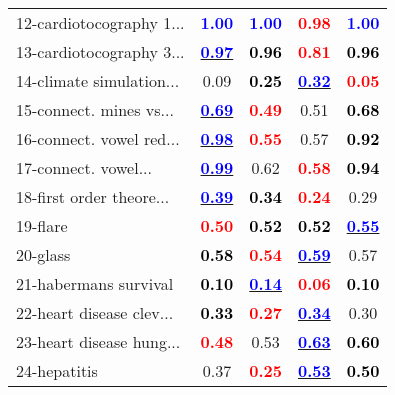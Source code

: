 \begin{table}
\begin{center}
\begin{tabular}{lc|c|c|c}
12-cardiotocography 1... & \textcolor{blue}{\textbf{  1.00}} & \textcolor{blue}{\textbf{  1.00}} & \textcolor{red}{\textbf{  0.98}} & \textcolor{blue}{\textbf{  1.00}} \\
13-cardiotocography 3... & \underline{\textcolor{blue}{\textbf{  0.97}}} & \textcolor{black}{\textbf{  0.96}} & \textcolor{red}{\textbf{  0.81}} & \textcolor{black}{\textbf{  0.96}} \\
14-climate simulation... &   0.09 & \textcolor{black}{\textbf{  0.25}} & \underline{\textcolor{blue}{\textbf{  0.32}}} & \textcolor{red}{\textbf{  0.05}} \\
15-connect. mines vs... & \underline{\textcolor{blue}{\textbf{  0.69}}} & \textcolor{red}{\textbf{  0.49}} &   0.51 & \textcolor{black}{\textbf{  0.68}} \\ \hline
16-connect. vowel red... & \underline{\textcolor{blue}{\textbf{  0.98}}} & \textcolor{red}{\textbf{  0.55}} &   0.57 & \textcolor{black}{\textbf{  0.92}} \\
17-connect. vowel... & \underline{\textcolor{blue}{\textbf{  0.99}}} &   0.62 & \textcolor{red}{\textbf{  0.58}} & \textcolor{black}{\textbf{  0.94}} \\
18-first order theore... & \underline{\textcolor{blue}{\textbf{  0.39}}} & \textcolor{black}{\textbf{  0.34}} & \textcolor{red}{\textbf{  0.24}} &   0.29 \\
19-flare & \textcolor{red}{\textbf{  0.50}} & \textcolor{black}{\textbf{  0.52}} & \textcolor{black}{\textbf{  0.52}} & \underline{\textcolor{blue}{\textbf{  0.55}}} \\
20-glass & \textcolor{black}{\textbf{  0.58}} & \textcolor{red}{\textbf{  0.54}} & \underline{\textcolor{blue}{\textbf{  0.59}}} &   0.57 \\ \hline
21-habermans survival & \textcolor{black}{\textbf{  0.10}} & \underline{\textcolor{blue}{\textbf{  0.14}}} & \textcolor{red}{\textbf{  0.06}} & \textcolor{black}{\textbf{  0.10}} \\
22-heart disease clev... & \textcolor{black}{\textbf{  0.33}} & \textcolor{red}{\textbf{  0.27}} & \underline{\textcolor{blue}{\textbf{  0.34}}} &   0.30 \\
23-heart disease hung... & \textcolor{red}{\textbf{  0.48}} &   0.53 & \underline{\textcolor{blue}{\textbf{  0.63}}} & \textcolor{black}{\textbf{  0.60}} \\
24-hepatitis &   0.37 & \textcolor{red}{\textbf{  0.25}} & \underline{\textcolor{blue}{\textbf{  0.53}}} & \textcolor{black}{\textbf{  0.50}} \\

\end{tabular}
\end{center}
\end{table}
